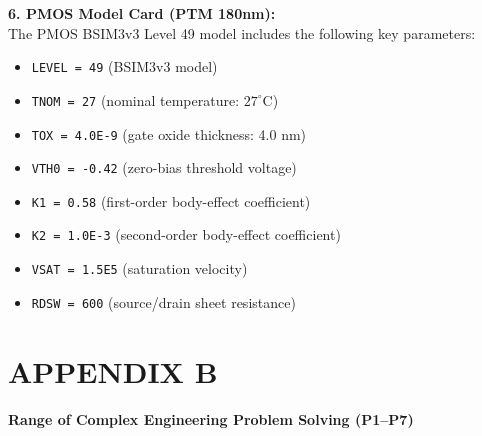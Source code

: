 \documentclass[12pt,a4paper,oneside]{report}
\begin{document}
\vspace{0.3cm}
\noindent\textbf{6. PMOS Model Card (PTM 180nm):}\\
The PMOS BSIM3v3 Level 49 model includes the following key parameters:
\begin{itemize}
\item \texttt{LEVEL = 49} (BSIM3v3 model)
\item \texttt{TNOM = 27} (nominal temperature: $27^\circ\text{C}$)
\item \texttt{TOX = 4.0E-9} (gate oxide thickness: 4.0 nm)
\item \texttt{VTH0 = -0.42} (zero-bias threshold voltage)
\item \texttt{K1 = 0.58} (first-order body-effect coefficient)
\item \texttt{K2 = 1.0E-3} (second-order body-effect coefficient)
\item \texttt{VSAT = 1.5E5} (saturation velocity)
\item \texttt{RDSW = 600} (source/drain sheet resistance)
\end{itemize}


\clearpage
\chapter*{APPENDIX B}

\noindent\textbf{Range of Complex Engineering Problem Solving (P1--P7)}

\vspace{0.5cm}
\end{document}

